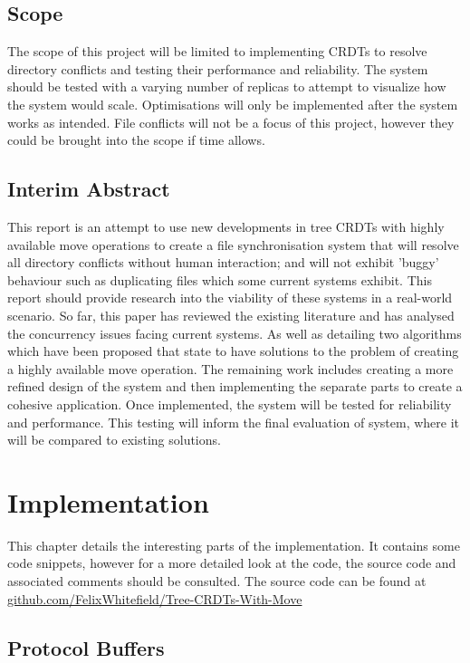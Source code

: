 \documentclass[12pt]{report}
\begin{document}
\section{Scope}
The scope of this project will be limited to implementing CRDTs to resolve directory conflicts and
testing their performance and reliability. The system should be tested with a varying number of
replicas to attempt to visualize how the system would scale. Optimisations will only be
implemented after the system works as intended.
File conflicts will not be a focus of this project, however they could be brought into the scope if
time allows.

\section{Interim Abstract}
This report is an attempt to use new developments in tree CRDTs with
highly available move operations to create a file synchronisation system that
will resolve all directory conflicts without human interaction; and will not
exhibit ’buggy’ behaviour such as duplicating files which some current systems exhibit. This report should provide research into the viability of these
systems in a real-world scenario. So far, this paper has reviewed the existing
literature and has analysed the concurrency issues facing current systems. As
well as detailing two algorithms which have been proposed that state to have
solutions to the problem of creating a highly available move operation.
The remaining work includes creating a more refined design of the system and
then implementing the separate parts to create a cohesive application. Once
implemented, the system will be tested for reliability and performance. This
testing will inform the final evaluation of system, where it will be compared
to existing solutions.

\chapter{Implementation}

This chapter details the interesting parts of the implementation. It contains some code snippets, however for a more detailed look at the code, the source code and associated comments should be consulted. The source code can be found at \url{github.com/FelixWhitefield/Tree-CRDTs-With-Move}

\newpage
\section{Protocol Buffers}\label{app:protobuf}
\end{document}
